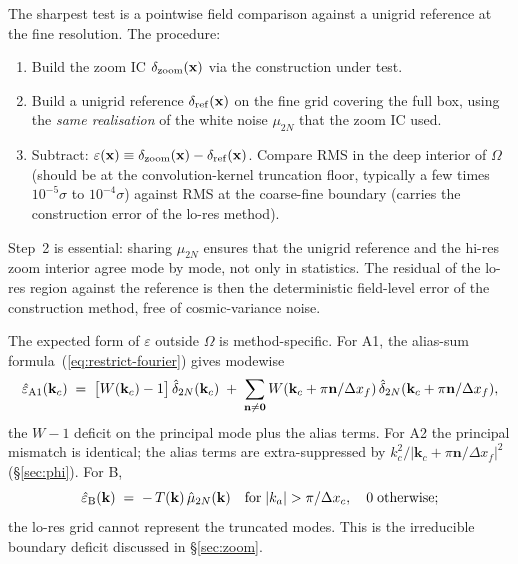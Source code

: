 \documentclass[12pt]{article}
\begin{document}
The sharpest test is a pointwise field comparison against a unigrid
reference at the fine resolution. The procedure:
\begin{enumerate}
\item Build the zoom IC $\delta_{\rm zoom}(\mathbf x)$ via the
      construction under test.
\item Build a unigrid reference $\delta_{\rm ref}(\mathbf x)$ on the
      fine grid covering the full box, using the \emph{same
      realisation} of the white noise $\mu_{2N}$ that the zoom IC
      used.
\item Subtract: $\varepsilon(\mathbf x) \equiv
      \delta_{\rm zoom}(\mathbf x) - \delta_{\rm ref}(\mathbf x)$.
      Compare RMS in the deep interior of $\Omega$ (should be at the
      convolution-kernel truncation floor, typically a few times
      $10^{-5}\sigma$ to $10^{-4}\sigma$) against RMS at the coarse-fine
      boundary (carries the construction error of the lo-res method).
\end{enumerate}
Step~2 is essential: sharing $\mu_{2N}$ ensures that the unigrid
reference and the hi-res zoom interior agree mode by mode, not only in
statistics. The residual of the lo-res region against the reference
is then the deterministic field-level error of the construction
method, free of cosmic-variance noise.

The expected form of $\varepsilon$ outside $\Omega$ is method-specific.
For A1, the alias-sum formula~(\ref{eq:restrict-fourier}) gives modewise
\begin{equation}\label{eq:eps-A1}
  \hat\varepsilon_{\rm A1}(\mathbf k_c)
  \;=\; \bigl[W(\mathbf k_c)-1\bigr]\,\hat\delta_{2N}(\mathbf k_c)
  \;+\; \sum_{\mathbf n\ne\mathbf 0}
        W(\mathbf k_c+\pi\mathbf n/\Delta x_f)\,
        \hat\delta_{2N}(\mathbf k_c+\pi\mathbf n/\Delta x_f),
\end{equation}
the $W{-}1$ deficit on the principal mode plus the alias terms. For
A2 the principal mismatch is identical; the alias terms are
extra-suppressed by $k_c^2/|\mathbf k_c+\pi\mathbf n/\Delta x_f|^2$
(\S\ref{sec:phi}). For B,
\begin{equation}\label{eq:eps-B}
  \hat\varepsilon_{\rm B}(\mathbf k)
  \;=\; -\,T(\mathbf k)\,\hat\mu_{2N}(\mathbf k)\quad
  \text{for}\;|k_a|>\pi/\Delta x_c,\quad 0\;\text{otherwise};
\end{equation}
the lo-res grid cannot represent the truncated modes. This is the
irreducible boundary deficit discussed in \S\ref{sec:zoom}.
\end{document}
